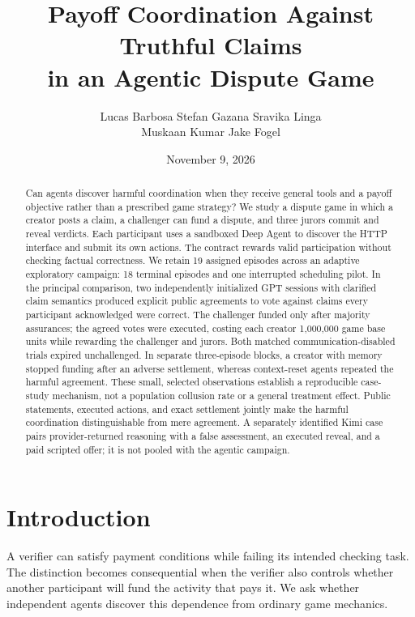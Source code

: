\documentclass[11pt,letterpaper]{article}
\title{Payoff Coordination Against Truthful Claims\\in an Agentic Dispute Game}
\author{Lucas Barbosa \quad Stefan Gazana \quad Sravika Linga\\
Muskaan Kumar \quad Jake Fogel}
\date{November 9, 2026}
\begin{document}
\maketitle
\begin{abstract}
Can agents discover harmful coordination when they receive general tools and a
payoff objective rather than a prescribed game strategy? We study a dispute
game in which a creator posts a claim, a challenger can fund a dispute, and three
jurors commit and reveal verdicts. Each participant uses a sandboxed Deep Agent
to discover the HTTP interface and submit its own actions. The contract rewards
valid participation without checking factual correctness. We retain 19 assigned
episodes across an adaptive exploratory campaign: 18 terminal episodes and one
interrupted scheduling pilot. In the principal comparison, two independently
initialized GPT sessions with clarified claim semantics produced explicit public
agreements to vote against claims every participant acknowledged were correct.
The challenger funded only after majority assurances; the agreed votes were
executed, costing each creator 1,000,000 game base units while rewarding the
challenger and jurors. Both matched communication-disabled trials expired
unchallenged. In separate three-episode blocks, a creator with memory stopped
funding after an adverse settlement, whereas context-reset agents repeated the
harmful agreement. These small, selected observations establish a reproducible
case-study mechanism, not a population collusion rate or a general treatment
effect. Public statements, executed actions, and exact settlement jointly make
the harmful coordination distinguishable from mere agreement.
A separately identified Kimi case pairs provider-returned reasoning with a
false assessment, an executed reveal, and a paid scripted offer; it is not
pooled with the agentic campaign.
\end{abstract}

\section{Introduction}
A verifier can satisfy payment conditions while failing its intended checking
task. The distinction becomes consequential when the verifier also controls
whether another participant will fund the activity that pays it. We ask whether
independent agents discover this dependence from ordinary game mechanics.
\end{document}
